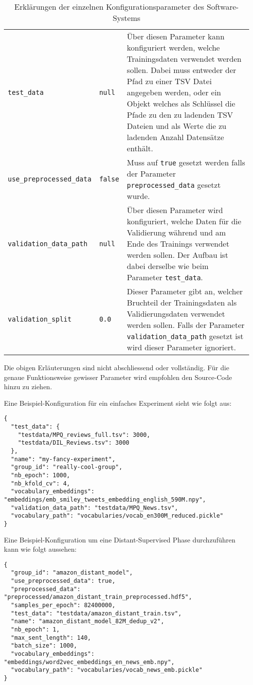 \begin{appendices}
\begin{table}[H]
\begin{adjustbox}{max width=\textwidth, max height=\textheight}
\begin{tabular}{@{}l|l|p{10cm}@{}}
      \texttt{test{\_}data} & \texttt{null} & Über diesen Parameter kann konfiguriert werden, welche Trainingsdaten verwendet werden sollen. Dabei muss entweder der Pfad zu einer TSV Datei angegeben werden, oder ein Objekt welches als Schlüssel die Pfade zu den zu ladenden TSV Dateien und als Werte die zu ladenden Anzahl Datensätze enthält.\\
      \texttt{use{\_}preprocessed{\_}data} & \texttt{false} & Muss auf \texttt{true} gesetzt werden falls der Parameter \texttt{preprocessed{\_}data} gesetzt wurde.\\
      \texttt{validation{\_}data{\_}path} & \texttt{null} & Über diesen Parameter wird konfiguriert, welche Daten für die Validierung während und am Ende des Trainings verwendet werden sollen. Der Aufbau ist dabei derselbe wie beim Parameter \texttt{test{\_}data}.\\
      \texttt{validation{\_}split} & \texttt{0.0} & Dieser Parameter gibt an, welcher Bruchteil der Trainingsdaten als Validierungsdaten verwendet werden sollen. Falls der Parameter \texttt{validation{\_}data{\_}path} gesetzt ist wird dieser Parameter ignoriert.\\
      \bottomrule
    \end{tabular}
  \end{adjustbox}
  \caption{Erklärungen der einzelnen Konfigurationsparameter des Software-Systems}
\end{table}

Die obigen Erläuterungen sind nicht abschliessend oder vollständig. Für die genaue Funktionsweise gewisser Parameter wird empfohlen den Source-Code hinzu zu ziehen.

Eine Beispiel-Konfiguration für ein einfaches Experiment sieht wie folgt aus:

\begin{lstlisting}[frame=none]
{
  "test_data": {
    "testdata/MPQ_reviews_full.tsv": 3000,
    "testdata/DIL_Reviews.tsv": 3000
  },
  "name": "my-fancy-experiment",
  "group_id": "really-cool-group",
  "nb_epoch": 1000,
  "nb_kfold_cv": 4,
  "vocabulary_embeddings": "embeddings/emb_smiley_tweets_embedding_english_590M.npy",
  "validation_data_path": "testdata/MPQ_News.tsv",
  "vocabulary_path": "vocabularies/vocab_en300M_reduced.pickle"
}
\end{lstlisting}

Eine Beispiel-Konfiguration um eine Distant-Supervised Phase durchzuführen kann wie folgt aussehen:

\begin{lstlisting}[frame=none]
{
  "group_id": "amazon_distant_model",
  "use_preprocessed_data": true,
  "preprocessed_data": "preprocessed/amazon_distant_train_preprocessed.hdf5",
  "samples_per_epoch": 82400000,
  "test_data": "testdata/amazon_distant_train.tsv",
  "name": "amazon_distant_model_82M_dedup_v2",
  "nb_epoch": 1,
  "max_sent_length": 140,
  "batch_size": 1000,
  "vocabulary_embeddings": "embeddings/word2vec_embeddings_en_news_emb.npy",
  "vocabulary_path": "vocabularies/vocab_news_emb.pickle"
}
\end{lstlisting}


\end{appendices}
